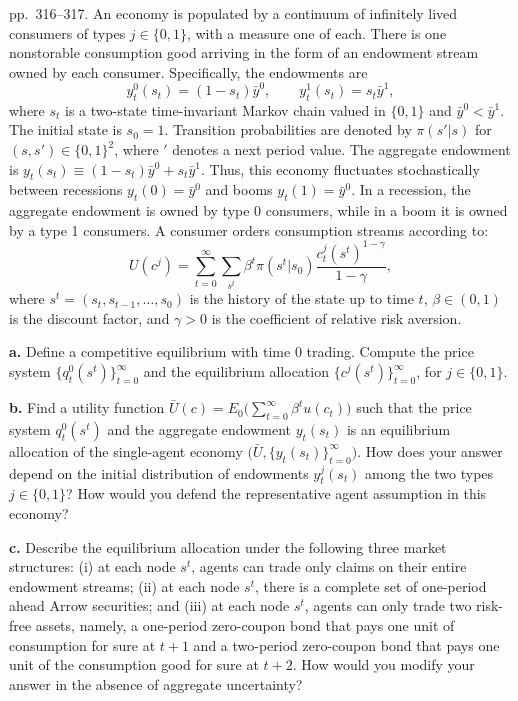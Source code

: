 \documentclass[12pt, letterpaper]{article}
\begin{document}
\begin{tcolorbox}[evenbox,title={Exercise 8.14 \quad Donated by Pierre-Olivier Weill}]
\begin{tcolorbox}[questionbox]
pp.~316--317. An economy is populated by a continuum of infinitely lived consumers of types $j\in\{0,1\}$,
with a measure one of each. There is one nonstorable consumption good arriving in the form of an
endowment stream owned by each consumer. Specifically, the endowments are
\[
y^0_t(s_t)=(1-s_t)\bar y^0,\qquad y^1_t(s_t)=s_t\bar y^1,
\]
where $s_t$ is a two-state time-invariant Markov chain valued in $\{0,1\}$ and $\bar y^0<\bar y^1$. The initial
state is $s_0=1$. Transition probabilities are denoted by $\pi(s'|s)$ for $(s,s')\in\{0,1\}^2$, where $'$ denotes
a next period value. The aggregate endowment is $y_t(s_t)\equiv(1-s_t)\bar y^0+s_t\bar y^1$. Thus, this economy
fluctuates stochastically between recessions $y_t(0)=\bar y^0$ and booms $y_t(1)=\bar y^0$. In a recession, the
aggregate endowment is owned by type 0 consumers, while in a boom it is owned by a type 1 consumers. A
consumer orders consumption streams according to:
\[
U(c^j)=\sum_{t=0}^\infty\sum_{s^t}\beta^t\pi(s^t|s_0)\frac{c^j_t(s^t)^{1-\gamma}}{1-\gamma},
\]
where $s^t=(s_t,s_{t-1},\dots,s_0)$ is the history of the state up to time $t$, $\beta\in(0,1)$ is the discount
factor, and $\gamma>0$ is the coefficient of relative risk aversion.

\textbf{a.} Define a competitive equilibrium with time 0 trading. Compute the price system
$\{q^0_t(s^t)\}_{t=0}^\infty$ and the equilibrium allocation $\{c^j(s^t)\}_{t=0}^\infty$, for $j\in\{0,1\}$.

\textbf{b.} Find a utility function $\bar U(c)=E_0\big(\sum_{t=0}^\infty\beta^tu(c_t)\big)$ such that the price system
$q^0_t(s^t)$ and the aggregate endowment $y_t(s_t)$ is an equilibrium allocation of the single-agent
economy $\big(\bar U,\{y_t(s_t)\}_{t=0}^\infty\big)$. How does your answer depend on the initial distribution of
endowments $y^j_t(s_t)$ among the two types $j\in\{0,1\}$? How would you defend the representative agent
assumption in this economy?

\textbf{c.} Describe the equilibrium allocation under the following three market structures: (i) at each node
$s^t$, agents can trade only claims on their entire endowment streams; (ii) at each node $s^t$, there is a
complete set of one-period ahead Arrow securities; and (iii) at each node $s^t$, agents can only trade two
risk-free assets, namely, a one-period zero-coupon bond that pays one unit of consumption for sure at $t+1$
and a two-period zero-coupon bond that pays one unit of the consumption good for sure at $t+2$. How would
you modify your answer in the absence of aggregate uncertainty?


\end{tcolorbox}
\end{tcolorbox}
\end{document}
